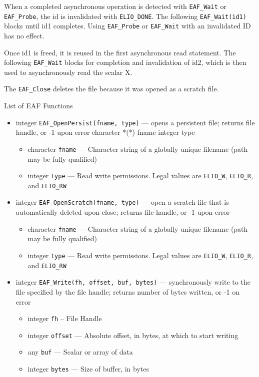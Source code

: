 When a completed asynchronous operation is detected with {\tt EAF\_Wait} or
{\tt EAF\_Probe}, the id is invalidated with {\tt ELIO\_DONE}.  The following {\tt EAF\_Wait(id1)}
blocks until id1 completes.  Using {\tt EAF\_Probe} or {\tt EAF\_Wait} with an invalidated
ID has no effect. 

Once id1 is freed, it is reused in the first asynchronous read statement.
The following {\tt EAF\_Wait} blocks for completion and invalidation of id2, which
is then used to asynchronously read the scalar X.

The {\tt EAF\_Close} deletes the file because it was opened as a scratch file.


List of EAF Functions

\begin{itemize}
\item integer {\tt EAF\_OpenPersist(fname, type)} --- opens a persistent file; returns file
handle, or -1 upon error
		character *(*)  fname
		integer   	type

\begin{itemize}
\item character     {\tt fname} --- Character string of a globally unique filename (path may
be fully qualified)
\item integer {\tt type} --- Read write permissions.  Legal values are {\tt ELIO\_W}, {\tt ELIO\_R},
		and {\tt ELIO\_RW}
\end{itemize}

\item integer {\tt EAF\_OpenScratch(fname, type)} --- open a scratch file that is automatically
deleted upon close; returns file handle, or -1 upon error
\begin{itemize}
\item character     {\tt fname} --- Character string of a globally unique filename (path may
be fully qualified)
\item integer {\tt type} --- Read write permissions.  Legal values are {\tt ELIO\_W}, {\tt ELIO\_R},
		and {\tt ELIO\_RW}
\end{itemize}

\item integer {\tt EAF\_Write(fh, offset, buf, bytes)} --- synchronously write to the
file specified by the file handle; returns number of bytes written, or -1 on error
\begin{itemize}
\item integer {\tt fh} -- File Handle
\item integer {\tt offset} --- Absolute offset, in bytes, at which to start writing
\item any {\tt buf} --- Scalar or array of data
\item integer {\tt bytes} --- Size of buffer, in bytes
\end{itemize}


\end{itemize}
